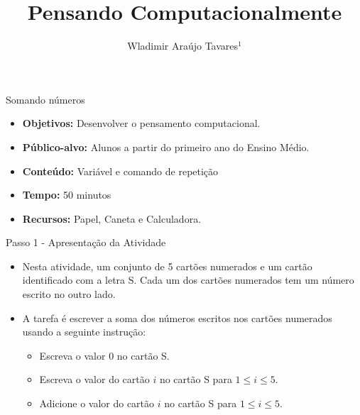\documentclass{beamer}
\title {Pensando Computacionalmente}
\author[Wladimir Araújo Tavares]{ Wladimir Araújo Tavares$^{1}$  }
\institute[UFC]{$^{1}$Universidade Federal do Ceará - Campus de Quixadá\\}
\date{}
\begin{document}
\begin{frame}
	\titlepage
\end{frame}




\begin{frame}{Somando números}

\begin{itemize}
\item \textbf{Objetivos:} Desenvolver o pensamento computacional.

\item \textbf{Público-alvo:}  Alunos a partir do primeiro ano do Ensino Médio.

\item \textbf{Conteúdo:} Variável e comando de repetição

\item \textbf{Tempo:} 50 minutos

\item \textbf{Recursos:} Papel, Caneta e Calculadora.

\end{itemize}
    
\end{frame}


\begin{frame}{Passo 1 - Apresentação da Atividade}

\begin{itemize}
   
\item <1->Nesta atividade, um conjunto de 5 cartões numerados e um cartão identificado com a letra S. Cada um dos cartões numerados tem  um número escrito no outro lado. 

\begin{center}
\end{center}


\item <2->A tarefa é escrever a soma dos números escritos nos cartões numerados usando a seguinte instrução:

\begin{itemize}
    \item Escreva o valor 0 no cartão S.
    \item Escreva o valor do cartão $i$ no cartão S para $1 \leq i \leq 5$.
    \item Adicione o valor do cartão $i$ no cartão S para $1 \leq i \leq 5$.
\end{itemize}


\end{itemize}

\end{frame}
\end{document}
